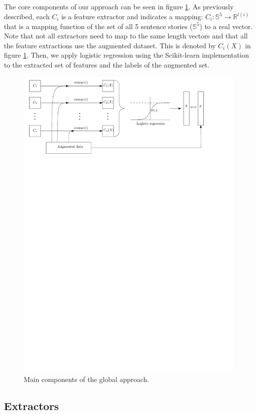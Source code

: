 \documentclass{article}
\begin{document}
The core components of our approach can be seen in figure \ref*{Main}. As
previously described, each $C_i$ is a feature extractor and indicates a mapping:
 $C_i: \mathbb{S}^5 \rightarrow \mathbb{R}^{l(i)}$ that is a mapping function of
 the set of all 5 sentence stories ($\mathbb{S}^5$) to a real vector. Note that 
 not all extractors need to map to the same length vectors and that all the feature
 extractions use the augmented dataset. This is
denoted by $C_i(X)$ in figure \ref*{Main}. Then, we apply logistic regression
using the Scikit-learn implementation \cite{SKL} to the extracted set of
features and the labels of the augmented set.
\begin{figure}
	\centering
	\includegraphics[scale=0.6]{fig/logistic_fitting.pdf}
	\caption{Main components of the global approach.}
	\label{Main}
\end{figure}
\subsection{Extractors}
\end{document}
